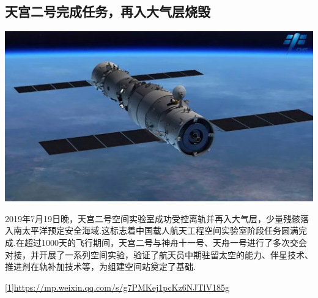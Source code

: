 \begin{multicols}{2}
\subsection*{天宫二号完成任务，再入大气层烧毁}

{\centering\includegraphics[width=0.8\linewidth]{IMG/201907/11.jpg}\vskip0cm}

2019年7月19日晚，天宫二号空间实验室成功受控离轨并再入大气层，少量残骸落入南太平洋预定安全海域.这标志着中国载人航天工程空间实验室阶段任务圆满完成.在超过1000天的飞行期间，天宫二号与神舟十一号、天舟一号进行了多次交会对接，并开展了一系列空间实验，验证了航天员中期驻留太空的能力、伴星技术、推进剂在轨补加技术等，为组建空间站奠定了基础.

\noindent {}

\noindent\url{[1]https://mp.weixin.qq.com/s/g7PMKej1pcKz6NJTlV185g}
\end{multicols}\newpage
{}
